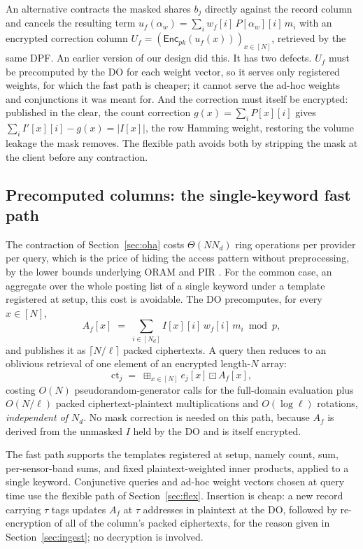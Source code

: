 \documentclass[a4paper,fleqn]{cas-sc}
\newcommand{\Enc}{\mathsf{Enc}}
\newcommand{\bplus}{\boxplus}
\newcommand{\bdot}{\boxdot}
\begin{document}
\begin{remark}
\label{rem:whyenc}
An alternative contracts the masked shares $b_j$ directly against the record
column and cancels the resulting term
$u_f(\alpha_w)=\sum_i w_f[i]\,P[\alpha_w][i]\,m_i$ with an encrypted correction
column $U_f=(\Enc_{pk}(u_f(x)))_{x\in[N]}$, retrieved by the same DPF. An
earlier version of our design did this. It has two defects. $U_f$ must be precomputed by
the DO for each weight vector, so it serves only registered weights, for which
the fast path is cheaper; it cannot serve the ad-hoc weights and conjunctions
it was meant for. And the correction must itself be encrypted: published in the
clear, the count correction $g(x)=\sum_iP[x][i]$ gives
$\sum_iI'[x][i]-g(x)=|I[x]|$, the row Hamming weight, restoring the volume
leakage the mask removes. The flexible path avoids both by stripping the mask
at the client before any contraction.
\end{remark}

\subsection{Precomputed columns: the single-keyword fast path}
\label{sec:fast}
The contraction of Section~\ref{sec:oha} costs $\Theta(N N_d)$ ring operations
per provider per query, which is the price of hiding the access pattern
without preprocessing, by the lower bounds underlying ORAM and PIR
\citep{goldreich1996software,beimel2000reducing}. For the common case, an
aggregate over the whole posting list of a single keyword under a template
registered at setup, this cost is avoidable. The DO precomputes, for every
$x\in[N]$,
\[
A_f[x] \;=\; \sum_{i\in[N_d]} I[x][i]\,w_f[i]\,m_i \bmod p ,
\]
and publishes it as $\lceil N/\ell\rceil$ packed ciphertexts. A query then
reduces to an oblivious retrieval of one element of an encrypted length-$N$
array:
\[
\text{ct}_j \;=\; \bplus_{x\in[N]} e_j[x]\bdot A_f[x],
\]
costing $O(N)$ pseudorandom-generator calls for the full-domain evaluation
plus $O(N/\ell)$ packed ciphertext-plaintext multiplications and
$O(\log \ell)$ rotations, \emph{independent of $N_d$}. No mask correction is
needed on this path, because $A_f$ is derived from the unmasked $I$ held by
the DO and is itself encrypted.

The fast path supports the templates registered at setup, namely count, sum,
per-sensor-band sums, and fixed plaintext-weighted inner products, applied to
a single keyword. Conjunctive queries and ad-hoc weight vectors chosen at
query time use the flexible path of Section~\ref{sec:flex}. Insertion is
cheap: a new record carrying $\tau$ tags updates $A_f$ at $\tau$ addresses in
plaintext at the DO, followed by re-encryption of all of the column's packed
ciphertexts, for the reason given in Section~\ref{sec:ingest}; no decryption
is involved.
\end{document}
